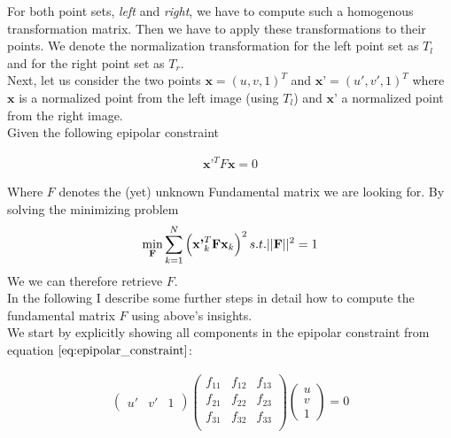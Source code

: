 \documentclass{paper}
\begin{document}
For both point sets, \emph{left} and \emph{right}, we have to compute such a homogenous transformation matrix. Then we have to apply these transformations to their points. We denote the normalization transformation for the left point set as $T_{l}$ and for the right point set as $T_{r}$. \\

Next, let us consider the two points $\textbf{x} = (u,v,1)^{T}$ and $\textbf{x'} = (u',v',1)^{T}$ where $\textbf{x}$ is a normalized point from the left image (using $T_l$) and $\textbf{x'}$ a normalized point from the right image. \\

Given the following epipolar constraint 

\begin{align}
    \textbf{x'}^{T} F \textbf{x} = 0
\label{eq:epipolar_constraint}
\end{align}

Where $F$ denotes the (yet) unknown Fundamental matrix we are looking for. By solving the minimizing problem 
\begin{align}
    \min_{\bf{F}} \sum^{N}_{k=1} \left(\textbf{x'}_{k}^{T} \textbf{F} \textbf{x}_{k}\right)^2 s.t. ||\textbf{F}||^2 = 1
\label{eq:min_problem}
\end{align}
 We we can therefore retrieve $F$. \\
 In the following I describe some further steps in detail how to compute the fundamental matrix $F$ using above's insights. \\

We start by explicitly showing all components in the epipolar constraint from equation $\ref{eq:epipolar_constraint}$: 

\begin{align}
\left(\begin{array}{ccc}
u' & v' & 1
\end{array}
\right)
\left(\begin{array}{ccc}
f_{11} & f_{12} & f_{13} \\
f_{21} & f_{22} & f_{23} \\
f_{31} & f_{32} & f_{33} \\
\end{array} \right)
\left(\begin{array}{c}
u \\
v \\
1
\end{array}
\right)
= 0
\label{eq:fundamental_matrix_block_form}
\end{align}
\end{document}
